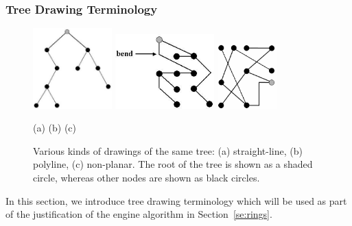\documentclass[]{article}
\begin{document}
{\subsubsection{Tree Drawing Terminology}

\begin{figure}[t]
\centerline{
\hspace{0.75in}
{\includegraphics[width=1.2in]{images/straight-line}}
{\includegraphics[width=1.5in]{images/polyline}}
\hspace{0.5cm}
{\includegraphics[width=0.90in]{images/non-planar}}\\
}
\hspace{4.75cm} (a)
\hspace{3.5cm} (b)
\hspace{2.6cm} (c)

\caption{Various kinds of drawings of the same tree: (a)
straight-line, (b) polyline, (c) non-planar.
The root of the tree is shown as a shaded circle, whereas
other nodes are shown as black circles.}
\label{fi:tree_examples}
\end{figure}

In this section, we introduce tree drawing terminology which will be used as part of the justification of the engine algorithm in Section~\ref{se:rings}.

}
\end{document}
